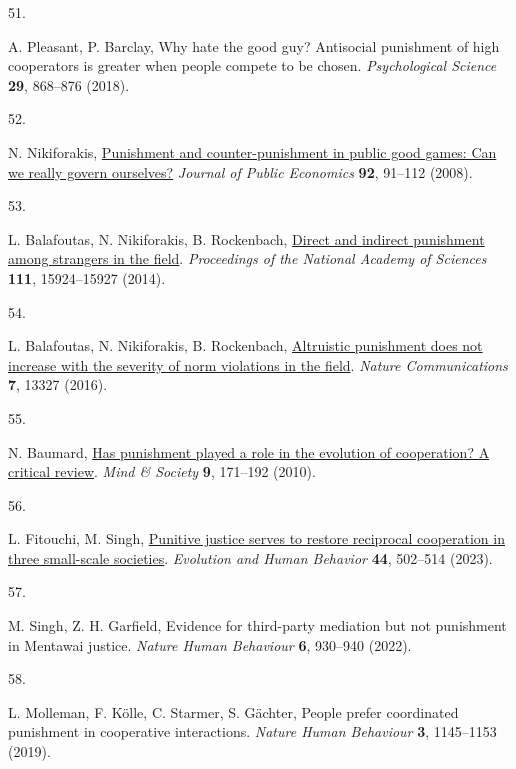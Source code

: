 \documentclass[
  man, donotrepeattitle,floatsintext]{apa6}
\newlength{\cslhangindent}
\newlength{\csllabelwidth}
\newlength{\cslentryspacingunit} %
\newenvironment{CSLReferences}[2] %
 {%
  \setlength{\parindent}{0pt}
  \ifodd #1
  \let\oldpar\par
  \def\par{\hangindent=\cslhangindent\oldpar}
  \fi
  \setlength{\parskip}{#2\cslentryspacingunit}
 }%
 {}
\newcommand{\CSLLeftMargin}[1]{\parbox[t]{\csllabelwidth}{#1}}
\newcommand{\CSLRightInline}[1]{\parbox[t]{\linewidth - \csllabelwidth}{#1}\break}
\begin{document}
\begin{CSLReferences}{0}{0}
\leavevmode{}%
\CSLLeftMargin{51. }%
\CSLRightInline{A. Pleasant, P. Barclay, Why hate the good guy? Antisocial punishment of high cooperators is greater when people compete to be chosen. \emph{Psychological Science} \textbf{29}, 868--876 (2018).}

\leavevmode{}%
\CSLLeftMargin{52. }%
\CSLRightInline{N. Nikiforakis, \href{https://doi.org/10.1016/j.jpubeco.2007.04.008}{Punishment and counter-punishment in public good games: Can we really govern ourselves?} \emph{Journal of Public Economics} \textbf{92}, 91--112 (2008).}

\leavevmode{}%
\CSLLeftMargin{53. }%
\CSLRightInline{L. Balafoutas, N. Nikiforakis, B. Rockenbach, \href{https://doi.org/10.1073/pnas.1413170111}{Direct and indirect punishment among strangers in the field}. \emph{Proceedings of the National Academy of Sciences} \textbf{111}, 15924--15927 (2014).}

\leavevmode{}%
\CSLLeftMargin{54. }%
\CSLRightInline{L. Balafoutas, N. Nikiforakis, B. Rockenbach, \href{https://doi.org/10.1038/ncomms13327}{Altruistic punishment does not increase with the severity of norm violations in the field}. \emph{Nature Communications} \textbf{7}, 13327 (2016).}

\leavevmode{}%
\CSLLeftMargin{55. }%
\CSLRightInline{N. Baumard, \href{https://doi.org/10.1007/s11299-010-0079-9}{Has punishment played a role in the evolution of cooperation? A critical review}. \emph{Mind \& Society} \textbf{9}, 171--192 (2010).}

\leavevmode{}%
\CSLLeftMargin{56. }%
\CSLRightInline{L. Fitouchi, M. Singh, \href{https://doi.org/10.1016/j.evolhumbehav.2023.03.001}{Punitive justice serves to restore reciprocal cooperation in three small-scale societies}. \emph{Evolution and Human Behavior} \textbf{44}, 502--514 (2023).}

\leavevmode{}%
\CSLLeftMargin{57. }%
\CSLRightInline{M. Singh, Z. H. Garfield, Evidence for third-party mediation but not punishment in {M}entawai justice. \emph{Nature Human Behaviour} \textbf{6}, 930--940 (2022).}

\leavevmode{}%
\CSLLeftMargin{58. }%
\CSLRightInline{L. Molleman, F. Kölle, C. Starmer, S. Gächter, People prefer coordinated punishment in cooperative interactions. \emph{Nature Human Behaviour} \textbf{3}, 1145--1153 (2019).}


\end{CSLReferences}
\end{document}
